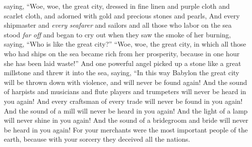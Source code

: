 \begin{biblechapter}
\verse saying,
\verse “Woe, woe, the great city, 
dressed in fine linen and purple cloth and scarlet cloth, 
and adorned with gold and precious stones and pearls,
\verse And every shipmaster and \textit{every seafarer} and sailors and all those who labor on the sea stood \textit{far off}
\verse and began to cry out when they saw the smoke of her burning, saying, “Who is like the great city?”
\verse “Woe, woe, the great city, 
in which all those who had ships on the sea 
became rich from her prosperity, 
because in one hour she has been laid waste!”
\verse And one powerful angel picked up a stone like a great millstone and threw it into the sea, saying,
\verse “In this way Babylon the great city will be thrown down with violence, 
and will never be found again!
\verse And the sound of harpists and musicians and flute players and trumpeters 
will never be heard in you again! 
And every craftsman of every trade 
will never be found in you again! 
And the sound of a mill 
will never be heard in you again!
\verse And the light of a lamp 
will never shine in you again! 
And the sound of a bridegroom and bride 
will never be heard in you again! 
For your merchants were the most important people of the earth, 
because with your sorcery they deceived all the nations.
\end{biblechapter}

